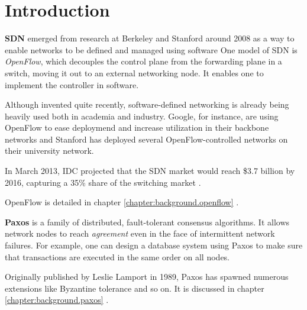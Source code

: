 \chapter{Introduction}


\textbf{\acf{SDN}} \cite{Casado:2005:VNS:1047344.1047383} emerged from
research at Berkeley and Stanford around 2008 as a way to enable networks to
be defined and managed using software
One model of \acs{SDN} is \textit{OpenFlow}, which decouples the control
plane from the forwarding plane in a switch, moving it out to an external
networking node.  It enables one to implement the controller in software.

Although invented quite recently, software-defined networking is already
being heavily used both in academia and industry.  Google, for instance, are
using OpenFlow to ease deploymend and increase utilization in their backbone
networks \cite{crabbe2012sdn} and Stanford has deployed several
OpenFlow-controlled networks on their university network.

In March 2013, IDC  projected that the SDN market would
  reach \${}3.7 billion by 2016, capturing a 35\%{} share of the switching
  market \cite{Kirkpatrick:2013:SN:2500468.2500473}.

OpenFlow is detailed in chapter \ref{chapter:background.openflow}
.

\textbf{Paxos} \cite{Lamport:1998:PP:279227.279229} is a
family of distributed, fault-tolerant consensus algorithms.  It allows
network nodes to reach \textit{agreement} even in the face of intermittent
network failures.  For example, one can design a database system using Paxos
to make sure that transactions are executed in the same order on all nodes.

Originally published by Leslie Lamport in 1989, Paxos
has spawned numerous extensions like Byzantine tolerance and so on.  It is
discussed in chapter \ref{chapter:background.paxos} .

